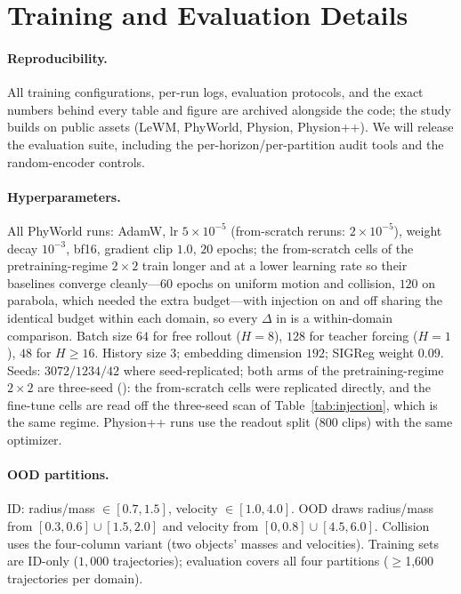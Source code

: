 \section{Training and Evaluation Details}
\label{app:details}

\paragraph{Reproducibility.}
All training configurations, per-run logs, evaluation protocols, and the exact numbers behind every table and figure are archived alongside the code; the study builds on public assets (LeWM, PhyWorld, Physion, Physion++). We will release the evaluation suite, including the per-horizon/per-partition audit tools and the random-encoder controls.

\paragraph{Hyperparameters.}
All PhyWorld runs: AdamW, lr $5{\times}10^{-5}$ (from-scratch reruns: $2{\times}10^{-5}$), weight decay $10^{-3}$, bf16, gradient clip $1.0$, $20$ epochs; the from-scratch cells of the pretraining-regime $2{\times}2$ train longer and at a lower learning rate so their baselines converge cleanly---$60$ epochs on uniform motion and collision, $120$ on parabola, which needed the extra budget---with injection on and off sharing the identical budget within each domain, so every $\Delta$ in  is a within-domain comparison. Batch size $64$ for free rollout ($H{=}8$), $128$ for teacher forcing ($H{=}1$), $48$ for $H{\geq}16$. History size $3$; embedding dimension $192$; SIGReg weight $0.09$. Seeds: $3072/1234/42$ where seed-replicated; both arms of the pretraining-regime $2{\times}2$ are three-seed (): the from-scratch cells were replicated directly, and the fine-tune cells are read off the three-seed scan of Table~\ref{tab:injection}, which is the same regime. Physion++ runs use the readout split ($800$ clips) with the same optimizer.

\paragraph{OOD partitions.}
ID: radius/mass $\in[0.7,1.5]$, velocity $\in[1.0,4.0]$. OOD draws radius/mass from $[0.3,0.6]\cup[1.5,2.0]$ and velocity from $[0,0.8]\cup[4.5,6.0]$. Collision uses the four-column variant (two objects' masses and velocities). Training sets are ID-only ($1{,}000$ trajectories); evaluation covers all four partitions ($\geq$1{,}600 trajectories per domain).

